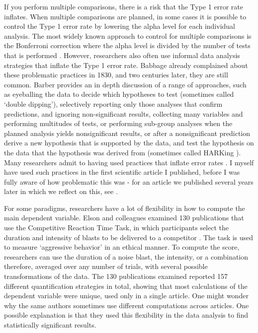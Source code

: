 \documentclass[
]{krantz}
\begin{document}
If you perform multiple comparisons, there is a risk that the Type 1 error rate inflates. When multiple comparisons are planned, in some cases it is possible to control the Type 1 error rate by lowering the alpha level for each individual analysis. The most widely known approach to control for multiple comparisons is the Bonferroni correction where the alpha level is divided by the number of tests that is performed \citep{dunn_multiple_1961}. However, researchers also often use informal data analysis strategies that inflate the Type 1 error rate. Babbage \citeyearpar{babbage_reflections_1830} already complained about these problematic practices in 1830, and two centuries later, they are still common. Barber \citeyearpar{barber_pitfalls_1976} provides an in depth discussion of a range of approaches, such as eyeballing the data to decide which hypotheses to test (sometimes called `double dipping'), selectively reporting only those analyses that confirm predictions, and ignoring non-significant results, collecting many variables and performing multitudes of tests, or performing sub-group analyses when the planned analysis yields nonsignificant results, or after a nonsignificant prediction derive a new hypothesis that is supported by the data, and test the hypothesis on the data that the hypothesis was derived from (sometimes called HARKing \citep{kerr_harking_1998}). Many researchers admit to having used practices that inflate error rates \citep{fiedler_questionable_2015, john_measuring_2012, van_de_schoot_use_2021, chin_questionable_2021, makel_both_2021}. I myself have used such practices in the first scientific article I published, before I was fully aware of how problematic this was - for an article we published several years later in which we reflect on this, see \citet{jostmann_short_2016}.

For some paradigms, researchers have a lot of flexibility in how to compute the main dependent variable. Elson and colleagues examined 130 publications that use the Competitive Reaction Time Task, in which participants select the duration and intensity of blasts to be delivered to a competitor \citep{elson_press_2014}. The task is used to measure `aggressive behavior' in an ethical manner. To compute the score, researchers can use the duration of a noise blast, the intensity, or a combination therefore, averaged over any number of trials, with several possible transformations of the data. The 130 publications examined reported 157 different quantification strategies in total, showing that most calculations of the dependent variable were unique, used only in a single article. One might wonder why the same authors sometimes use different computations across articles. One possible explanation is that they used this flexibility in the data analysis to find statistically significant results.
\end{document}

